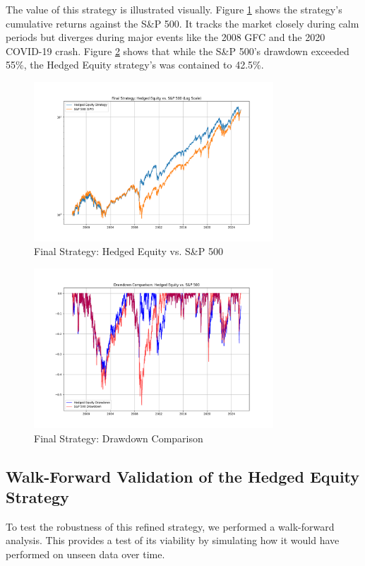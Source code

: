 \documentclass{article}
\begin{document}
The value of this strategy is illustrated visually. Figure \ref{fig:hedged_equity_curve} shows the strategy's cumulative returns against the S\&P 500. It tracks the market closely during calm periods but diverges during major events like the 2008 GFC and the 2020 COVID-19 crash. Figure \ref{fig:hedged_equity_drawdowns} shows that while the S\&P 500's drawdown exceeded 55\%, the Hedged Equity strategy's was contained to 42.5\%.

\begin{figure}[htbp]
    \centering
    \includegraphics[width=0.8\textwidth]{plots/plot_hedged_equity_curve.png}
    \caption{Final Strategy: Hedged Equity vs. S\&P 500}
    \label{fig:hedged_equity_curve}
\end{figure}

\begin{figure}[htbp]
    \centering
    \includegraphics[width=0.8\textwidth]{plots/plot_hedged_equity_drawdowns.png}
    \caption{Final Strategy: Drawdown Comparison}
    \label{fig:hedged_equity_drawdowns}
\end{figure}

\subsection{Walk-Forward Validation of the Hedged Equity Strategy}
To test the robustness of this refined strategy, we performed a walk-forward analysis. This provides a test of its viability by simulating how it would have performed on unseen data over time.
\end{document}
